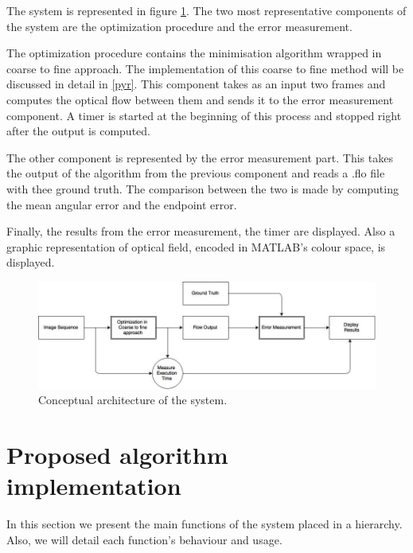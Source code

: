 \documentclass[12pt,a4paper,twoside]{report}
\begin{document}
{The system is represented in figure \ref{bigd}.
The two most representative components of the system are the optimization procedure and the error measurement.

The optimization procedure contains the minimisation algorithm wrapped in coarse to fine approach. The implementation of this coarse to fine method will be discussed in detail in \ref{pyr}. This component takes as an input two frames and computes the optical flow between them and sends it to the error measurement component. A timer is started at the beginning of this process and stopped right after the output is computed.


The other component is represented by the error measurement part. This takes the output of the algorithm from the previous component and reads a .flo file with thee ground truth. The comparison between the two is made by computing the mean angular error and the endpoint error.  

Finally, the results from the error measurement, the timer are displayed. Also a graphic representation of optical field, encoded in MATLAB's colour space, is displayed.


\begin{figure}
	\label{bigd}
	\centering
	\includegraphics[width = 6.2in]{img/bigflow} 
	\caption{Conceptual architecture of the system.}
\end{figure}

\section{Proposed algorithm implementation}

In this section we present the main functions of the system placed in a hierarchy. Also, we will detail each function's behaviour and usage.


}
\end{document}
